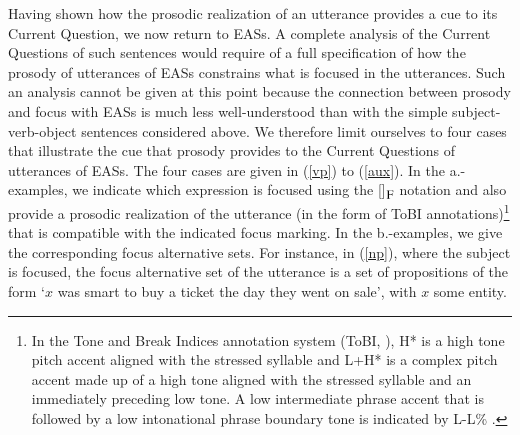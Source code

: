 \documentclass[11pt,fleqn]{article}
\newcommand{\foc}{$_{\mbox{\small F}}$}
\newcommand{\6}{\mbox{$[\hspace*{-.6mm}[$}}
\newcommand{\9}{\mbox{$]\hspace*{-.6mm}]$}}
\begin{document}
Having shown how the prosodic realization of an utterance provides a cue to its  Current Question, we now return to EASs. A complete analysis of the Current Questions of such sentences would require of a full specification of how the prosody of utterances of EASs constrains what is focused in the utterances. Such an analysis cannot be given at this point because  the connection between prosody and focus with EASs is much less well-understood than with the simple subject-verb-object sentences considered above. We therefore limit ourselves to four cases that illustrate the cue that prosody provides to the Current Questions of utterances of EASs. The four cases are given in (\ref{vp}) to (\ref{aux}). In the a.-examples, we indicate which expression is focused using the [\hspace*{.1cm}]\foc{} notation and also provide a prosodic realization of the utterance (in the form of  ToBI annotations)\footnote{In the Tone and Break Indices annotation system (ToBI,
\citealt{beckman-ayers97}), H* is a
high tone pitch accent aligned with the stressed syllable and L+H*  is a
complex pitch accent made up of a high tone aligned with the stressed
syllable and an immediately preceding low tone. A low intermediate phrase accent
that is followed by a low intonational phrase boundary tone is indicated
by L-L\% .} that is compatible with the indicated focus marking. In the b.-examples, we give the corresponding focus alternative sets. For instance, in (\ref{np}), where the subject is focused, the focus alternative set of the utterance is a set of propositions of the form `$x$ was smart to buy a ticket the day they went on sale', with $x$ some entity.
\end{document}

